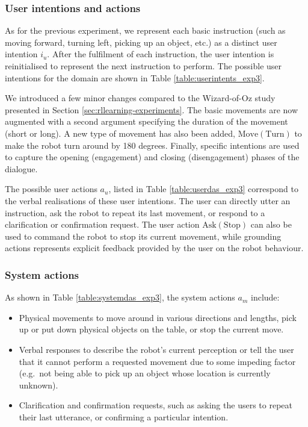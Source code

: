 \subsubsection*{User intentions and actions}

As for the previous experiment, we represent each basic instruction (such as moving forward, turning left, picking up an object, etc.) as a distinct user intention $i_u$. After the fulfilment of each instruction, the user intention is reinitialised to represent the next instruction to perform.  The possible user intentions for the domain are shown in Table \ref{table:userintents_exp3}.  


We introduced a few minor changes compared to the Wizard-of-Oz study presented in Section \ref{sec:rllearning-experiments}. The basic movements are now augmented with a second argument specifying the duration of the movement (short or long). A new type of movement has also been added, $\mathrm{Move(Turn)}$ to make the robot turn around by 180 degrees.  Finally, specific intentions are used to capture the opening (engagement) and closing (disengagement) phases of the dialogue. 

The possible user actions $a_u$, listed in Table \ref{table:userdas_exp3} correspond to the verbal realisations of these user intentions. The user can directly utter an instruction, ask the robot to repeat its last movement, or respond to a clarification or confirmation request.   The user action $\mathrm{Ask(Stop)}$ can also be used to command the robot to stop its current movement, while grounding actions represents explicit  feedback provided by the user on the robot behaviour.

\subsubsection*{System actions}
As shown in Table \ref{table:systemdas_exp3}, the system actions $a_m$ include: \begin{itemize}
\item Physical movements to move around in various directions and lengths, pick up or put down physical objects on the table, or stop the current move.
\item Verbal responses to describe the robot's current perception or tell the user that it cannot perform a requested movement due to some impeding factor (e.g.\ not being able to pick up an object whose location is currently unknown). 
\item Clarification and confirmation requests, such as asking the users to repeat their last utterance, or confirming a particular intention.
\end{itemize}

